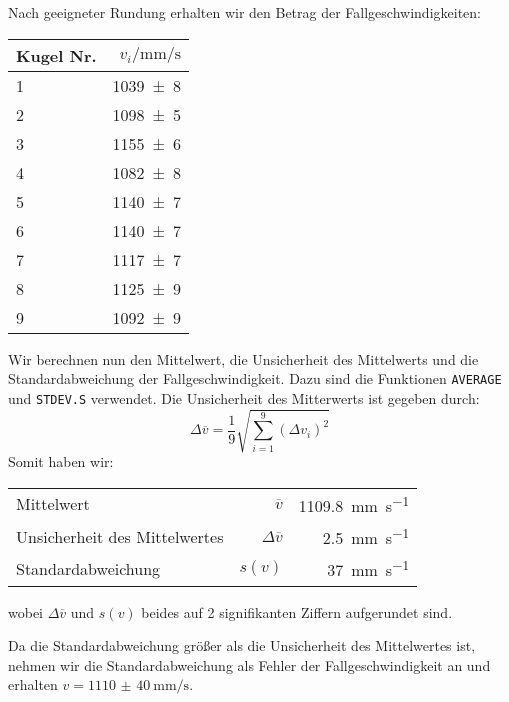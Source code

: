 		Nach geeigneter Rundung erhalten wir den Betrag der Fallgeschwindigkeiten:
		\begin{center}
			\begin{tabular}{lr}
				\toprule
				Kugel Nr. & $v_i/\si{\milli\meter\per\second}$ \\
				\midrule
					\num{1} & \num{1039(8)} \\
					\num{2} & \num{1098(5)} \\
					\num{3} & \num{1155(6)} \\
					\num{4} & \num{1082(8)} \\
					\num{5} & \num{1140(7)} \\
					\num{6} & \num{1140(7)} \\
					\num{7} & \num{1117(7)} \\
					\num{8} & \num{1125(9)} \\
					\num{9} & \num{1092(9)} \\
				\bottomrule
			\end{tabular}
		\end{center}
		Wir berechnen nun den Mittelwert, die Unsicherheit des Mittelwerts und die Standardabweichung der Fallgeschwindigkeit. Dazu sind die Funktionen \texttt{AVERAGE} und \texttt{STDEV.S} verwendet. Die Unsicherheit des Mitterwerts ist gegeben durch:
		\begin{equation}
			\Delta \overline{v} = \frac{1}{9} \sqrt{\sum^{9}_{i=1}(\Delta v_i)^2}
		\end{equation}
		Somit haben wir:
		\begin{center}
			\begin{tabular}{lrr}
				\toprule
				Mittelwert & $\overline{v}$ & \SI{1109.8}{\milli\meter\per\second}\\
				Unsicherheit des Mittelwertes & $\Delta\overline{v}$ & \SI{2.5}{\milli\meter\per\second}\\
				Standardabweichung & $s(v)$ & \SI{37}{\milli\meter\per\second}\\
				\bottomrule
			\end{tabular}
		\end{center}
		wobei $\Delta\overline{v}$ und $s(v)$ beides auf 2 signifikanten Ziffern aufgerundet sind. 

		Da die Standardabweichung größer als die Unsicherheit des Mittelwertes ist, nehmen wir die Standardabweichung als Fehler der Fallgeschwindigkeit an und erhalten $v = \SI{1110(40)}{\milli\meter\per\second}$.

